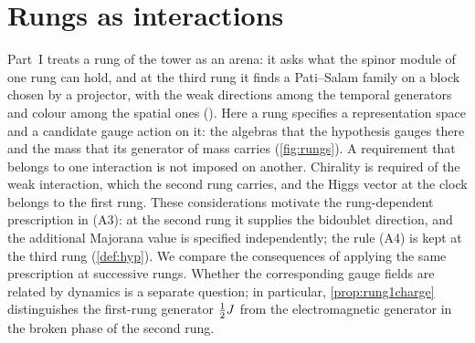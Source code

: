 \section{Rungs as interactions}
\label{sec:interactions}

Part~I treats a rung of the tower as an arena: it asks what the spinor module of one rung can hold, and at the third rung it finds a
Pati--Salam family on a block chosen by a projector, with the weak directions among the temporal generators and colour among the spatial
ones (). Here a rung specifies a representation space and a candidate gauge action on it: the algebras that the hypothesis
gauges there and the mass that its generator of mass carries (\cref{fig:rungs}). A requirement that belongs to one interaction is not imposed
on another. Chirality is required of the weak interaction, which the second rung carries, and the Higgs vector at the clock belongs to the
first rung. These considerations motivate the rung-dependent prescription in (A3): at the second rung it supplies the bidoublet
direction, and the additional Majorana value is specified independently; the rule (A4) is kept at the third rung (\cref{def:hyp}). We compare the
consequences of applying the same prescription at successive rungs. Whether the corresponding gauge fields are related by dynamics is a
separate question; in particular, \cref{prop:rung1charge} distinguishes the first-rung generator $\tfrac12 J$ from the electromagnetic generator
in the broken phase of the second rung.

